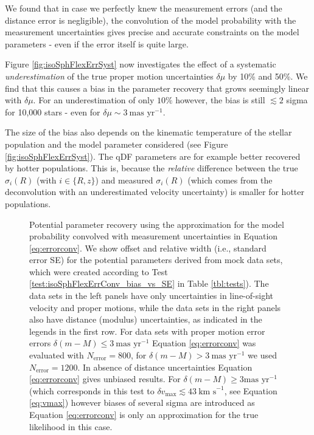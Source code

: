 We found that in case we perfectly knew the measurement errors (and the distance error is negligible), the convolution of the model probability with the measurement uncertainties gives precise and accurate constraints on the model parameters - even if the error itself is quite large.

Figure \ref{fig:isoSphFlexErrSyst} now investigates the effect of a systematic \emph{underestimation} of the true proper motion uncertainties $\delta \mu$ by 10\% and 50\%. We find that this causes a bias in the parameter recovery that grows seemingly linear with $\delta \mu$. For an underestimation of only $10\%$ however, the bias is still $\lesssim 2$ sigma for 10,000 stars \Wilma{[TO DO: Check]} - even for $\delta \mu \sim 3~\text{mas yr}^{-1}$.

The size of the bias also depends on the kinematic temperature of the stellar population and the model parameter considered (see Figure \ref{fig:isoSphFlexErrSyst}). The qDF parameters are for example better recovered by hotter populations. This is, because the \emph{relative} difference between the true $\sigma_i(R)$ (with $i \in \{R,z\}$) and measured $\sigma_i(R)$ (which comes from the deconvolution with an underestimated velocity uncertainty) is smaller for hotter populations. 


\begin{figure}[!htbp]
\caption{Potential parameter recovery using the approximation for the model probability convolved with measurement uncertainties in Equation \ref{eq:errorconv}. We show  \pdf{} offset and relative width (i.e., standard error SE) for the potential parameters derived from mock data sets, which were created according to Test \ref{test:isoSphFlexErrConv_bias_vs_SE} in Table \ref{tbl:tests}). The data sets in the left panels have only uncertainties in line-of-sight velocity and proper motions, while the data sets in the right panels also have distance (modulus) uncertainties, as indicated in the legends in the first row. For data sets with proper motion error errors $\delta(m-M) \leq 3 \ \text{mas yr}^{-1}$ Equation \ref{eq:errorconv} was evaluated with $N_\text{error}=800$, for $\delta(m-M) > 3 \ \text{mas yr}^{-1}$ we used $N_\text{error}=1200$. In absence of distance uncertainties Equation \ref{eq:errorconv} gives unbiased results. For $\delta(m-M) \geq 3 \text{mas yr}^{-1}$ (which corresponds in this test to $\delta v_\text{max} \lesssim 43 \ \text{km s}^{-1}$, see Equation \ref{eq:vmax}) however biases of several sigma are introduced as Equation \ref{eq:errorconv} is only an approximation for the true likelihood in this case. }
\label{fig:isoSphFlexErrConv_bias_vs_SE}
\end{figure}

